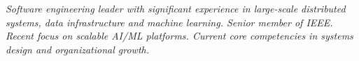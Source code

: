 {\selectfont
	\begin{justify}\textit{Software engineering leader with significant experience in large-scale distributed systems, data infrastructure and machine learning. Senior member of IEEE. Recent focus on scalable AI/ML platforms. Current core competencies in systems design and organizational growth.}\end{justify}
}